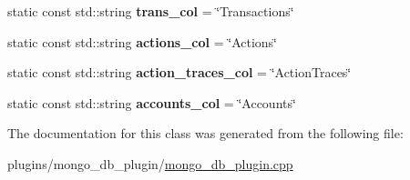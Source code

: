 \begin{DoxyCompactItemize}
\item 
\mbox{\label{classaacio_1_1mongo__db__plugin__impl_a2c26e294583fe98d1307cc292628cd7c}} 
static const std\+::string {\bfseries trans\+\_\+col} = \char`\"{}Transactions\char`\"{}
\item 
\mbox{\label{classaacio_1_1mongo__db__plugin__impl_af6fbc8a5a3c51ca105397ec1c0500730}} 
static const std\+::string {\bfseries actions\+\_\+col} = \char`\"{}Actions\char`\"{}
\item 
\mbox{\label{classaacio_1_1mongo__db__plugin__impl_ac8b764d18690e30e122923d766957ce4}} 
static const std\+::string {\bfseries action\+\_\+traces\+\_\+col} = \char`\"{}Action\+Traces\char`\"{}
\item 
\mbox{\label{classaacio_1_1mongo__db__plugin__impl_a6e314e6d5cadfd7e203d7ddfc7cc3e68}} 
static const std\+::string {\bfseries accounts\+\_\+col} = \char`\"{}Accounts\char`\"{}
\end{DoxyCompactItemize}


The documentation for this class was generated from the following file\+:\begin{DoxyCompactItemize}
\item 
plugins/mongo\+\_\+db\+\_\+plugin/\mbox{\hyperlink{mongo__db__plugin_8cpp}{mongo\+\_\+db\+\_\+plugin.\+cpp}}\end{DoxyCompactItemize}
